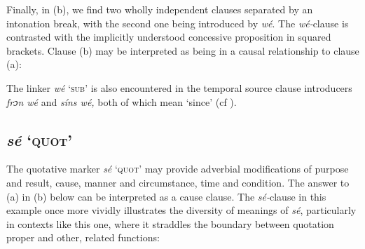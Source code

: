 Finally, in (b), we find two wholly independent clauses separated by an intonation break, with the second one being introduced by \textit{wé}. The \textit{wé-}clause is contrasted with the implicitly understood concessive proposition in squared brackets. Clause (b) may be interpreted as being in a causal relationship to clause (a):


\ea%
    \label{ex:key:1466}
\z\z

The linker \textit{wé} ‘\textsc{sub}’ is also encountered in the temporal source clause introducers \textit{frɔn wé} and \textit{síns wé,} both of which mean ‘since’ (cf ).

\subsection{\textit{sé} ‘\textsc{quot’}} \label{sec:10.7.2}

The quotative marker \textit{sé} ‘\textsc{quot}’ may provide adverbial modifications of purpose and result, cause, manner and circumstance, time and condition. The answer to (a) in (b) below can be interpreted as a cause clause. The \textit{sé-}clause in this example once more vividly illustrates the diversity of meanings of \textit{sé}, particularly in contexts like this one, where it straddles the boundary between quotation proper and other, related functions:


\ea%
    \label{ex:key:1467}
\z\z

